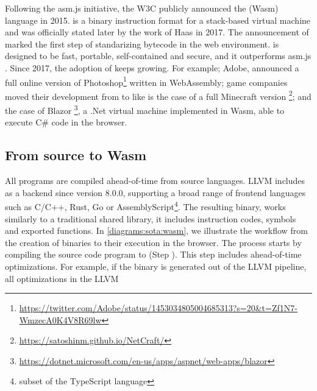 Following the asm.js initiative, the W3C publicly announced the \wasm (Wasm) language in 2015. \wasm is a binary instruction format for a stack-based virtual machine and was officially stated later by the work of Haas \etal \cite{Haas_2017} in 2017. The announcement of \wasm marked the first step of standarizing bytecode in the web environment. is designed to be fast, portable, self-contained and secure, and it outperforms asm.js \cite{Haas_2017}. Since 2017, the adoption of \wasm keeps growing. For example; Adobe, announced a full online version of Photoshop\footnote{\url{https://twitter.com/Adobe/status/1453034805004685313?s=20&t=Zf1N7-WmzecA0K4V8R69lw}} written in WebAssembly;  game companies moved their development from to like is the case of a full Minecraft version \footnote{\url{https://satoshinm.github.io/NetCraft/}}; and the case of Blazor \footnote{\url{https://dotnet.microsoft.com/en-us/apps/aspnet/web-apps/blazor}}, a .Net virtual machine implemented in Wasm, able to execute C\# code in the browser.


\subsection*{From source to Wasm}

All \wasm programs are compiled ahead-of-time from source languages. LLVM includes as a backend since version 8.0.0, supporting a broad range of frontend languages such as C/C++, Rust, Go or AssemblyScript\footnote{subset of the TypeScript language}. The resulting binary, works similarly to a traditional shared library, it includes instruction codes, symbols and exported functions. In \autoref{diagrams:sota:wasm}, we illustrate the workflow from the creation of binaries to their execution in the browser. The process starts by compiling the source code program to (Step ). This step includes ahead-of-time optimizations. For example, if the binary is generated out of the LLVM pipeline, all optimizations in the LLVM 


